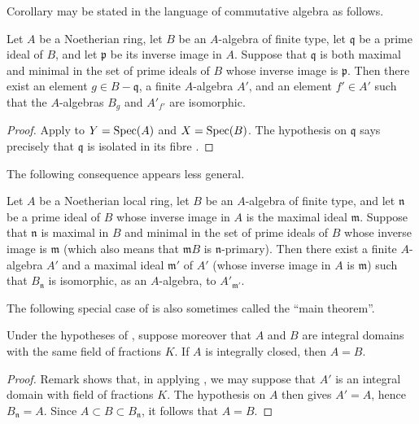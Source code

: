 Corollary  may be stated in the language of
commutative algebra as follows.

\begin{corollary}[4.4.6]
\label{III.4.4.6}
Let $A$ be a Noetherian ring, let $B$ be an $A$-algebra of finite
type, let $\mathfrak q$ be a prime ideal of $B$, and let $\mathfrak p$
be its inverse image in $A$.  Suppose that $\mathfrak q$ is both
maximal and minimal in the set of prime ideals of $B$ whose inverse
image is $\mathfrak p$.  Then there exist an element
$g\in B-\mathfrak q$, a finite $A$-algebra $A'$, and an element
$f'\in A'$ such that the $A$-algebras $B_g$ and $A'_{f'}$ are
isomorphic.
\end{corollary}

\begin{proof}
Apply  to $Y=\operatorname{Spec}(A)$ and $X=\operatorname{Spec}(B)$.  The
hypothesis on $\mathfrak q$ says precisely that $\mathfrak q$ is
isolated in its fibre .
\end{proof}

The following consequence appears less general.


\begin{corollary}[4.4.7]
\label{III.4.4.7}
Let $A$ be a Noetherian local ring, let $B$ be an $A$-algebra of
finite type, and let $\mathfrak n$ be a prime ideal of $B$ whose
inverse image in $A$ is the maximal ideal $\mathfrak m$.  Suppose
that $\mathfrak n$ is maximal in $B$ and minimal in the set of prime
ideals of $B$ whose inverse image is $\mathfrak m$ (which also means
that $\mathfrak mB$ is $\mathfrak n$-primary).  Then there exist a
finite $A$-algebra $A'$ and a maximal ideal $\mathfrak m'$ of $A'$
(whose inverse image in $A$ is $\mathfrak m$) such that $B_{\mathfrak
n}$ is isomorphic, as an $A$-algebra, to $A'_{\mathfrak m'}$.
\end{corollary}

The following special case of  is also sometimes
called the ``main theorem''.

\begin{corollary}[4.4.8]
\label{III.4.4.8}
Under the hypotheses of , suppose moreover that $A$
and $B$ are integral domains with the same field of fractions $K$.
If $A$ is integrally closed, then $A=B$.
\end{corollary}

\begin{proof}
Remark  shows that, in applying
, we may suppose that $A'$ is an integral domain
with field of fractions $K$.  The hypothesis on $A$ then gives
$A'=A$, hence $B_{\mathfrak n}=A$.  Since
$A\subset B\subset B_{\mathfrak n}$, it follows that $A=B$.
\end{proof}

